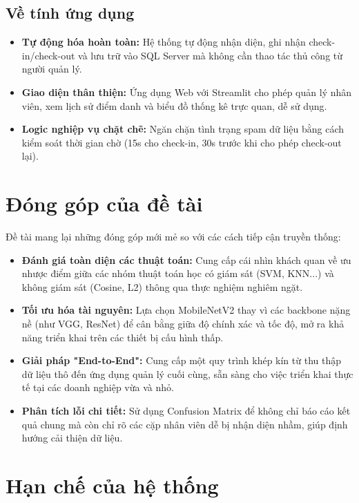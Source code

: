 \documentclass[a4paper]{book}
\begin{document}
\subsection*{Về tính ứng dụng}
\begin{itemize}
    \item \textbf{Tự động hóa hoàn toàn:} Hệ thống tự động nhận diện, ghi nhận check-in/check-out và lưu trữ vào SQL Server mà không cần thao tác thủ công từ người quản lý.
    \item \textbf{Giao diện thân thiện:} Ứng dụng Web với Streamlit cho phép quản lý nhân viên, xem lịch sử điểm danh và biểu đồ thống kê trực quan, dễ sử dụng.
    \item \textbf{Logic nghiệp vụ chặt chẽ:} Ngăn chặn tình trạng spam dữ liệu bằng cách kiểm soát thời gian chờ (15s cho check-in, 30s trước khi cho phép check-out lại).
\end{itemize}

\section{Đóng góp của đề tài}

Đề tài mang lại những đóng góp mới mẻ so với các cách tiếp cận truyền thống:

\begin{itemize}
    \item \textbf{Đánh giá toàn diện các thuật toán:} Cung cấp cái nhìn khách quan về ưu nhược điểm giữa các nhóm thuật toán học có giám sát (SVM, KNN...) và không giám sát (Cosine, L2) thông qua thực nghiệm nghiêm ngặt.
    \item \textbf{Tối ưu hóa tài nguyên:} Lựa chọn MobileNetV2 thay vì các backbone nặng nề (như VGG, ResNet) để cân bằng giữa độ chính xác và tốc độ, mở ra khả năng triển khai trên các thiết bị cấu hình thấp.
    \item \textbf{Giải pháp "End-to-End":} Cung cấp một quy trình khép kín từ thu thập dữ liệu thô đến ứng dụng quản lý cuối cùng, sẵn sàng cho việc triển khai thực tế tại các doanh nghiệp vừa và nhỏ.
    \item \textbf{Phân tích lỗi chi tiết:} Sử dụng Confusion Matrix để không chỉ báo cáo kết quả chung mà còn chỉ rõ các cặp nhân viên dễ bị nhận diện nhầm, giúp định hướng cải thiện dữ liệu.
\end{itemize}

\section{Hạn chế của hệ thống}
\end{document}
